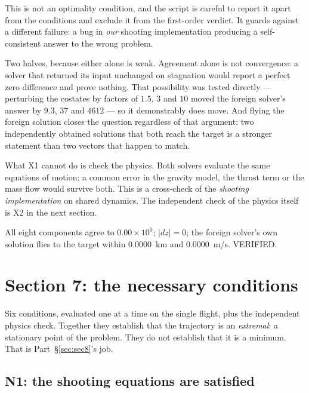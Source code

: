 \documentclass[11pt]{article}
\begin{document}
\begin{intu}
This is not an optimality condition, and the script is careful to report it
apart from the conditions and exclude it from the first-order verdict. It
guards against a different failure: a bug in \emph{our} shooting implementation
producing a self-consistent answer to the wrong problem.

Two halves, because either alone is weak. Agreement alone is not convergence:
a solver that returned its input unchanged on stagnation would report a perfect
zero difference and prove nothing. That possibility was tested directly ---
perturbing the costates by factors of $1.5$, $3$ and $10$ moved the foreign
solver's answer by $9.3$, $37$ and $4612$ --- so it demonstrably does move. And
flying the foreign solution closes the question regardless of that argument:
two independently obtained solutions that both reach the target is a stronger
statement than two vectors that happen to match.
\end{intu}

\begin{warn}
What X1 cannot do is check the physics. Both solvers evaluate the same
equations of motion; a common error in the gravity model, the thrust term or
the mass flow would survive both. This is a cross-check of the
\emph{shooting implementation} on shared dynamics. The independent check of the
physics itself is X2 in the next section.
\end{warn}

\begin{ran}
All eight components agree to $0.00\times10^{0}$; $|dz| = 0$; the foreign
solver's own solution flies to the target within $0.0000$~km and
$0.0000$~m/s. VERIFIED.
\end{ran}

\section{Section 7: the necessary conditions}\label{sec:sec7}

Six conditions, evaluated one at a time on the single flight, plus the
independent physics check. Together they establish that the trajectory is an
\emph{extremal}: a stationary point of the problem. They do not establish that
it is a minimum. That is Part~\S\ref{sec:sec8}'s job.

\subsection{N1: the shooting equations are satisfied}\label{sec:N1}
\end{document}
